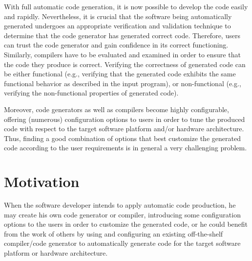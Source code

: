 With full automatic code generation, it is now possible to develop the code easily and rapidly. 
Nevertheless, it is crucial that the software being automatically generated undergoes an appropriate verification and validation technique to determine that the code generator has generated correct code. Therefore, users can trust the code generator and gain confidence in its correct functioning. 
Similarly, compilers have to be evaluated and examined in order to ensure that the code they produce is correct. Verifying the correctness of generated code can be either functional (e.g., verifying that the generated code exhibits the same functional behavior as described in the input program), or non-functional (e.g., verifying the non-functional properties of generated code).

Moreover, code generators as well as compilers become highly configurable, offering
(numerous) configuration options to users in order to tune the produced code with respect to the target software platform and/or hardware architecture. Thus, finding a good combination of options that best customize the generated code according to the user requirements is in general a very challenging problem.





\section{Motivation}

When the software developer intends to apply automatic code production, he may create his own code generator or compiler, introducing some configuration options to the users in order to customize the generated code, or he could benefit from the work of others by using and configuring an existing off-the-shelf compiler/code generator to automatically generate code for the target software platform or hardware architecture. 

